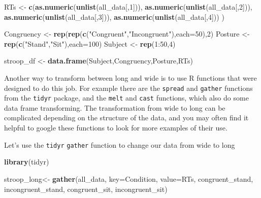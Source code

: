 \documentclass[]{book}
\newenvironment{Shaded}{\begin{snugshade}}{\end{snugshade}}
\newcommand{\KeywordTok}[1]{\textcolor[rgb]{0.13,0.29,0.53}{\textbf{{#1}}}}
\newcommand{\DataTypeTok}[1]{\textcolor[rgb]{0.13,0.29,0.53}{{#1}}}
\newcommand{\DecValTok}[1]{\textcolor[rgb]{0.00,0.00,0.81}{{#1}}}
\newcommand{\StringTok}[1]{\textcolor[rgb]{0.31,0.60,0.02}{{#1}}}
\newcommand{\NormalTok}[1]{{#1}}
\theoremstyle{definition}
\theoremstyle{definition}
\theoremstyle{definition}
\theoremstyle{remark}
\begin{document}
\begin{Shaded}
\begin{Highlighting}[]
\NormalTok{RTs <-}\StringTok{ }\KeywordTok{c}\NormalTok{(}\KeywordTok{as.numeric}\NormalTok{(}\KeywordTok{unlist}\NormalTok{(all_data[,}\DecValTok{1}\NormalTok{])),}
         \KeywordTok{as.numeric}\NormalTok{(}\KeywordTok{unlist}\NormalTok{(all_data[,}\DecValTok{2}\NormalTok{])),}
         \KeywordTok{as.numeric}\NormalTok{(}\KeywordTok{unlist}\NormalTok{(all_data[,}\DecValTok{3}\NormalTok{])),}
         \KeywordTok{as.numeric}\NormalTok{(}\KeywordTok{unlist}\NormalTok{(all_data[,}\DecValTok{4}\NormalTok{]))}
         \NormalTok{)}

\NormalTok{Congruency <-}\StringTok{ }\KeywordTok{rep}\NormalTok{(}\KeywordTok{rep}\NormalTok{(}\KeywordTok{c}\NormalTok{(}\StringTok{"Congruent"}\NormalTok{,}\StringTok{"Incongruent"}\NormalTok{),}\DataTypeTok{each=}\DecValTok{50}\NormalTok{),}\DecValTok{2}\NormalTok{)}
\NormalTok{Posture <-}\StringTok{ }\KeywordTok{rep}\NormalTok{(}\KeywordTok{c}\NormalTok{(}\StringTok{"Stand"}\NormalTok{,}\StringTok{"Sit"}\NormalTok{),}\DataTypeTok{each=}\DecValTok{100}\NormalTok{)}
\NormalTok{Subject <-}\StringTok{ }\KeywordTok{rep}\NormalTok{(}\DecValTok{1}\NormalTok{:}\DecValTok{50}\NormalTok{,}\DecValTok{4}\NormalTok{)}

\NormalTok{stroop_df <-}\StringTok{ }\KeywordTok{data.frame}\NormalTok{(Subject,Congruency,Posture,RTs)}
\end{Highlighting}
\end{Shaded}

Another way to transform between long and wide is to use R functions
that were designed to do this job. For example there are the
\texttt{spread} and \texttt{gather} functions from the \texttt{tidyr}
package, and the \texttt{melt} and \texttt{cast} functions, which also
do some data frame transforming. The transformation from wide to long
can be complicated depending on the structure of the data, and you may
often find it helpful to google these functions to look for more
examples of their use.

Let's use the \texttt{tidyr} \texttt{gather} function to change our data
from wide to long

\begin{Shaded}
\begin{Highlighting}[]
\KeywordTok{library}\NormalTok{(tidyr)}

\NormalTok{stroop_long<-}\StringTok{ }\KeywordTok{gather}\NormalTok{(all_data, }\DataTypeTok{key=}\NormalTok{Condition, }\DataTypeTok{value=}\NormalTok{RTs, }
                     \NormalTok{congruent_stand, incongruent_stand,}
                     \NormalTok{congruent_sit, incongruent_sit)}
\end{Highlighting}
\end{Shaded}
\end{document}

